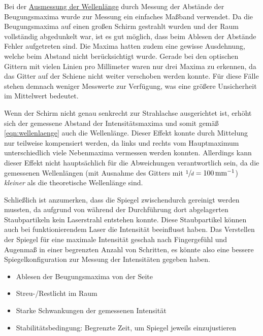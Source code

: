     Bei der \hyperref[sec:auswertung:wellenlaenge]{Ausmessung der Wellenlänge} durch Messung der Abstände der Beugungsmaxima
    wurde zur Messung ein einfaches Maßband verwendet.
    Da die Beugungsmaxima auf einen großen Schirm gestrahlt wurden und der Raum vollständig abgedunkelt war,
    ist es gut möglich,
    dass beim Ablesen der Abstände Fehler aufgetreten sind.
    Die Maxima hatten zudem eine gewisse Ausdehnung,
    welche beim Abstand nicht berücksichtigt wurde.
    Gerade bei den optischen Gittern mit vielen Linien pro Millimeter waren nur drei Maxima zu erkennen,
    da das Gitter auf der Schiene nicht weiter verschoben werden konnte.
    Für diese Fälle stehen demnach weniger Messwerte zur Verfügung,
    was eine größere Unsicherheit im Mittelwert bedeutet.

    Wenn der Schirm nicht genau senkrecht zur Strahlachse ausgerichtet ist,
    erhöht sich der gemessene Abstand der Intensitätsmaxima und somit gemäß \autoref{eqn:wellenlaenge} auch die Wellenlänge.
    Dieser Effekt konnte durch Mittelung nur teilweise kompensiert werden,
    da links und rechts vom Hauptmaximum unterschiedlich viele Nebenmaxima vermessen werden konnten.
    Allerdings kann dieser Effekt nicht hauptsächlich für die Abweichungen verantwortlich sein,
    da die gemessenen Wellenlängen (mit Ausnahme des Gitters mit $\sfrac{1}{d} = \SI[per-mode=reciprocal]{100}{\per\milli\meter}$)
    \textit{kleiner} als die theoretische Wellenlänge sind.


    Schließlich ist anzumerken,
    dass die Spiegel zwischendurch gereinigt werden mussten,
    da aufgrund von während der Durchführung dort abgelagerten Staubpartikeln kein Laserstrahl entstehen konnte.
    Diese Staubpartikel können auch bei funktionierendem Laser die Intensität beeinflusst haben.
    Das Verstellen der Spiegel für eine maximale Intensität geschah nach Fingergefühl und Augenmaß
    in einer begrenzten Anzahl von Schritten,
    es könnte also eine bessere Spiegelkonfiguration zur Messung der Intensitäten gegeben haben.

\begin{itemize}
    \item Ablesen der Beugungsmaxima von der Seite
    \item Streu-/Restlicht im Raum
    \item Starke Schwankungen der gemessenen Intensität
    \item Stabilitätsbedingung: Begrenzte Zeit, um Spiegel jeweils einzujustieren
\end{itemize}

